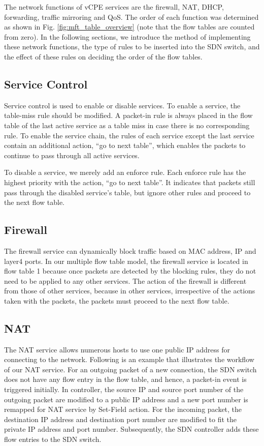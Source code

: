 \documentclass[conference]{IEEEtran}
\begin{document}
The network functions of vCPE services are the firewall, NAT, DHCP, forwarding, traffic mirroring and QoS. The order of each function was determined as shown in Fig. \ref{fig:mft_table_overview} (note that the flow tables are counted from zero). In the following sections, we introduce the method of implementing these network functions, the type of rules to be inserted into the SDN switch, and the effect of these rules on deciding the order of the flow tables.



\subsection{Service Control}
Service control is used to enable or disable services. To enable a service, the table-miss rule should be modified. A packet-in rule is always placed in the flow table of the last active service as a table miss in case there is no corresponding rule. To enable the service chain, the rules of each service except the last service contain an additional action, ``go to next table'', which enables the packets to continue to pass through all active services.

To disable a service, we merely add an enforce rule. Each enforce rule has the highest priority with the action, ``go to next table''. It indicates that packets still pass through the disabled service’s table, but ignore other rules and proceed to the next flow table.



\subsection{Firewall}
The firewall service can dynamically block traffic based on MAC address, IP and layer4 ports.
In our multiple flow table model, the firewall service is located in flow table 1 because once packets are detected by the blocking rules, they do not need to be applied to any other services.
The action of the firewall is different from those of other services, because in other services, irrespective of the actions taken with the packets, the packets must proceed to the next flow table.



\subsection{NAT}
The NAT service allows numerous hosts to use one public IP address for connecting to the network.
Following is an example that illustrates the workflow of our NAT service.
For an outgoing packet of a new connection, the SDN switch does not have any flow entry in the flow table, and hence, a packet-in event is triggered initially.
In controller, the source IP and source port number of the outgoing packet are modified to a public IP address and a new port number is remapped for NAT service by Set-Field action.
For the incoming packet, the destination IP address and destination port number are modified to fit the private IP address and port number.
Subsequently, the SDN controller adds these flow entries to the SDN switch.
\end{document}
